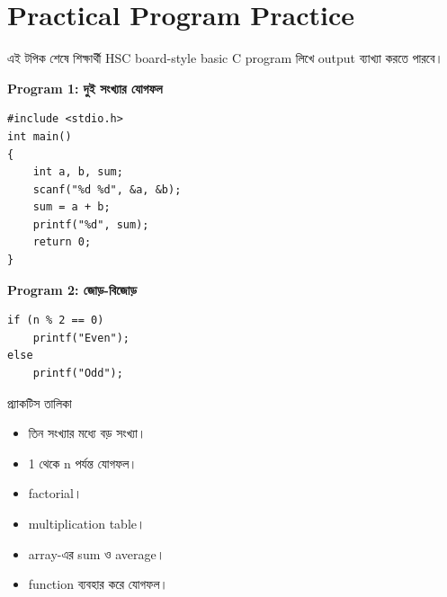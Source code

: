 \section{Practical Program Practice}

\begin{learningbox}
এই টপিক শেষে শিক্ষার্থী HSC board-style basic C program লিখে output ব্যাখ্যা করতে পারবে।
\end{learningbox}

\begin{practicebox}
\textbf{Program 1: দুই সংখ্যার যোগফল}
\begin{verbatim}
#include <stdio.h>
int main()
{
    int a, b, sum;
    scanf("%d %d", &a, &b);
    sum = a + b;
    printf("%d", sum);
    return 0;
}
\end{verbatim}
\end{practicebox}

\begin{practicebox}
\textbf{Program 2: জোড়-বিজোড়}
\begin{verbatim}
if (n % 2 == 0)
    printf("Even");
else
    printf("Odd");
\end{verbatim}
\end{practicebox}

\begin{keypointbox}{প্র্যাকটিস তালিকা}
\begin{itemize}
\item তিন সংখ্যার মধ্যে বড় সংখ্যা।
\item 1 থেকে n পর্যন্ত যোগফল।
\item factorial।
\item multiplication table।
\item array-এর sum ও average।
\item function ব্যবহার করে যোগফল।
\end{itemize}
\end{keypointbox}
